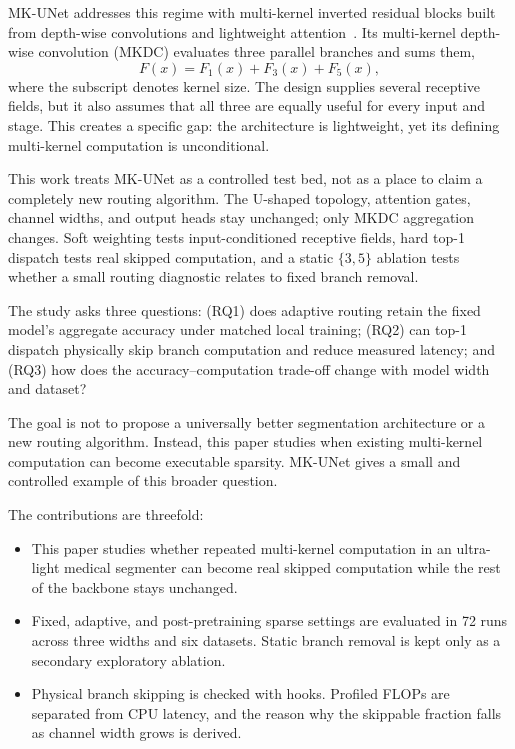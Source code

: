 \documentclass[conference]{IEEEtran}
\begin{document}
MK-UNet addresses this regime with multi-kernel inverted residual blocks built from depth-wise convolutions and lightweight attention~\cite{rahman2025mkunet}. Its multi-kernel depth-wise convolution (MKDC) evaluates three parallel branches and sums them,
\begin{equation}
    F(x)=F_1(x)+F_3(x)+F_5(x),
    \label{eq:fixed}
\end{equation}
where the subscript denotes kernel size. The design supplies several receptive fields, but it also assumes that all three are equally useful for every input and stage. This creates a specific gap: the architecture is lightweight, yet its defining multi-kernel computation is unconditional.

This work treats MK-UNet as a controlled test bed, not as a place to claim a completely new routing algorithm. The U-shaped topology, attention gates, channel widths, and output heads stay unchanged; only MKDC aggregation changes. Soft weighting tests input-conditioned receptive fields, hard top-1 dispatch tests real skipped computation, and a static $\{3,5\}$ ablation tests whether a small routing diagnostic relates to fixed branch removal.

The study asks three questions: (RQ1) does adaptive routing retain the fixed model's aggregate accuracy under matched local training; (RQ2) can top-1 dispatch physically skip branch computation and reduce measured latency; and (RQ3) how does the accuracy--computation trade-off change with model width and dataset?

The goal is not to propose a universally better segmentation architecture or a new routing algorithm. Instead, this paper studies when existing multi-kernel computation can become executable sparsity. MK-UNet gives a small and controlled example of this broader question.

The contributions are threefold:
\begin{itemize}
    \item This paper studies whether repeated multi-kernel computation in an ultra-light medical segmenter can become real skipped computation while the rest of the backbone stays unchanged.
    \item Fixed, adaptive, and post-pretraining sparse settings are evaluated in 72 runs across three widths and six datasets. Static branch removal is kept only as a secondary exploratory ablation.
    \item Physical branch skipping is checked with hooks. Profiled FLOPs are separated from CPU latency, and the reason why the skippable fraction falls as channel width grows is derived.
\end{itemize}
\end{document}
